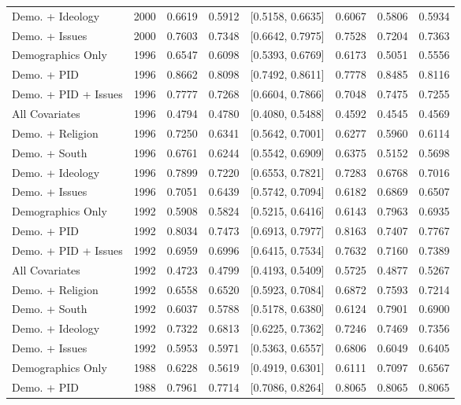 \begin{longtable}{lrrrlrrr}
  Demo. + Ideology & 2000 & 0.6619 & 0.5912 & [0.5158, 0.6635] & 0.6067 & 0.5806 & 0.5934 \\ 
  Demo. + Issues & 2000 & 0.7603 & 0.7348 & [0.6642, 0.7975] & 0.7528 & 0.7204 & 0.7363 \\ 
  Demographics Only & 1996 & 0.6547 & 0.6098 & [0.5393, 0.6769] & 0.6173 & 0.5051 & 0.5556 \\ 
  Demo. + PID & 1996 & 0.8662 & 0.8098 & [0.7492, 0.8611] & 0.7778 & 0.8485 & 0.8116 \\ 
  Demo. + PID + Issues & 1996 & 0.7777 & 0.7268 & [0.6604, 0.7866] & 0.7048 & 0.7475 & 0.7255 \\ 
  All Covariates & 1996 & 0.4794 & 0.4780 & [0.4080, 0.5488] & 0.4592 & 0.4545 & 0.4569 \\ 
  Demo. + Religion & 1996 & 0.7250 & 0.6341 & [0.5642, 0.7001] & 0.6277 & 0.5960 & 0.6114 \\ 
  Demo. + South & 1996 & 0.6761 & 0.6244 & [0.5542, 0.6909] & 0.6375 & 0.5152 & 0.5698 \\ 
  Demo. + Ideology & 1996 & 0.7899 & 0.7220 & [0.6553, 0.7821] & 0.7283 & 0.6768 & 0.7016 \\ 
  Demo. + Issues & 1996 & 0.7051 & 0.6439 & [0.5742, 0.7094] & 0.6182 & 0.6869 & 0.6507 \\ 
  Demographics Only & 1992 & 0.5908 & 0.5824 & [0.5215, 0.6416] & 0.6143 & 0.7963 & 0.6935 \\ 
  Demo. + PID & 1992 & 0.8034 & 0.7473 & [0.6913, 0.7977] & 0.8163 & 0.7407 & 0.7767 \\ 
  Demo. + PID + Issues & 1992 & 0.6959 & 0.6996 & [0.6415, 0.7534] & 0.7632 & 0.7160 & 0.7389 \\ 
  All Covariates & 1992 & 0.4723 & 0.4799 & [0.4193, 0.5409] & 0.5725 & 0.4877 & 0.5267 \\ 
  Demo. + Religion & 1992 & 0.6558 & 0.6520 & [0.5923, 0.7084] & 0.6872 & 0.7593 & 0.7214 \\ 
  Demo. + South & 1992 & 0.6037 & 0.5788 & [0.5178, 0.6380] & 0.6124 & 0.7901 & 0.6900 \\ 
  Demo. + Ideology & 1992 & 0.7322 & 0.6813 & [0.6225, 0.7362] & 0.7246 & 0.7469 & 0.7356 \\ 
  Demo. + Issues & 1992 & 0.5953 & 0.5971 & [0.5363, 0.6557] & 0.6806 & 0.6049 & 0.6405 \\ 
  Demographics Only & 1988 & 0.6228 & 0.5619 & [0.4919, 0.6301] & 0.6111 & 0.7097 & 0.6567 \\ 
  Demo. + PID & 1988 & 0.7961 & 0.7714 & [0.7086, 0.8264] & 0.8065 & 0.8065 & 0.8065 \\ 

\end{longtable}
